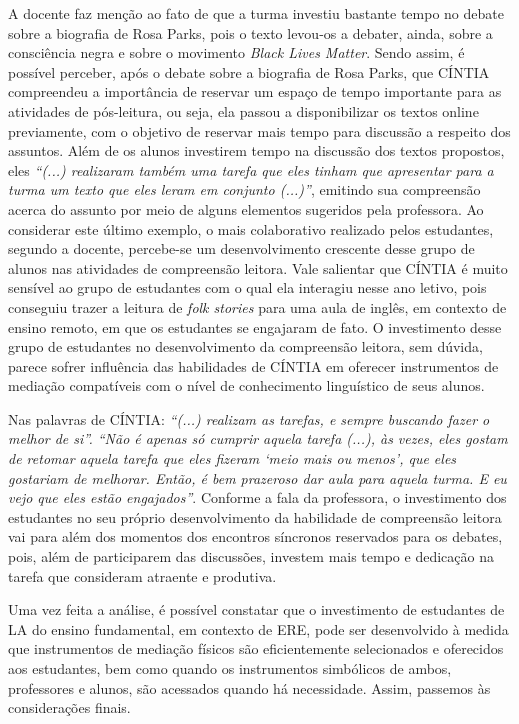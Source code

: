 \documentclass{textolivre}
\begin{document}
A docente faz menção ao fato de que a turma investiu bastante tempo no debate sobre a biografia de Rosa Parks, pois o texto levou-os a debater, ainda, sobre a consciência negra e sobre o movimento \emph{Black Lives Matter}. Sendo assim, é possível perceber, após o debate sobre a biografia de Rosa Parks, que CÍNTIA compreendeu a importância de reservar um espaço de tempo importante para as atividades de pós-leitura, ou seja, ela passou a disponibilizar os textos online previamente, com o objetivo de reservar mais tempo para discussão a respeito dos assuntos. Além de os alunos investirem tempo na discussão dos textos propostos, eles \emph{“(...) realizaram também uma tarefa que eles tinham que apresentar para a turma um texto que eles leram em conjunto (...)”}, emitindo sua compreensão acerca do assunto por meio de alguns elementos sugeridos pela professora. Ao considerar este último exemplo, o mais colaborativo realizado pelos estudantes, segundo a docente, percebe-se um desenvolvimento crescente desse grupo de alunos nas atividades de compreensão leitora. Vale salientar que CÍNTIA é muito sensível ao grupo de estudantes com o qual ela interagiu nesse ano letivo, pois conseguiu trazer a leitura de \emph{folk stories} para uma aula de inglês, em contexto de ensino remoto, em que os estudantes se engajaram de fato. O investimento desse grupo de estudantes no desenvolvimento da compreensão leitora, sem dúvida, parece sofrer influência das habilidades de CÍNTIA em oferecer instrumentos de mediação compatíveis com o nível de conhecimento linguístico de seus alunos.

Nas palavras de CÍNTIA: \emph{“(...) realizam as tarefas, e sempre buscando fazer o melhor de si”.  “Não é apenas só cumprir aquela tarefa (...), às vezes, eles gostam de retomar aquela tarefa que eles fizeram ‘meio mais ou menos’, que eles gostariam de melhorar. Então, é bem prazeroso dar aula para aquela turma. E eu vejo que eles estão engajados”}. Conforme a fala da professora, o investimento dos estudantes no seu próprio desenvolvimento da habilidade de compreensão leitora vai para além dos momentos dos encontros síncronos reservados para os debates, pois, além de participarem das discussões, investem mais tempo e dedicação na tarefa que consideram atraente e produtiva.

Uma vez feita a análise, é possível constatar que o investimento de estudantes de LA do ensino fundamental, em contexto de ERE, pode ser desenvolvido à medida que instrumentos de mediação físicos são eficientemente selecionados e oferecidos aos estudantes, bem como quando os instrumentos simbólicos de ambos, professores e alunos, são acessados quando há necessidade. Assim, passemos às considerações finais.
\end{document}
